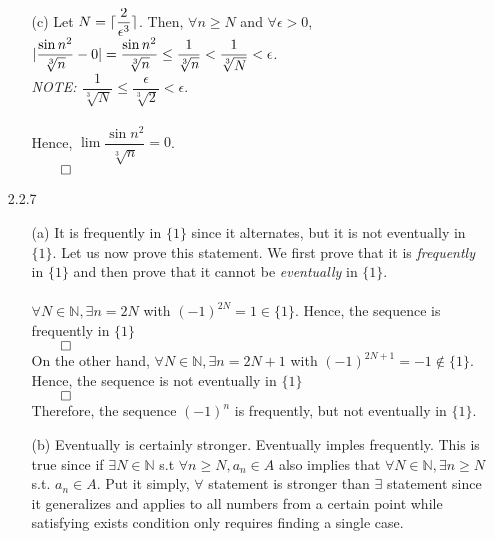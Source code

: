 \documentclass[11pt]{article}
\DeclarePairedDelimiter\abs{\lvert}{\rvert}%
\DeclarePairedDelimiter{\ceil}{\lceil}{\rceil}
\newcommand{\nats}{\mathbb{N}}
\begin{document}
\begin{itemize}
\begin{itemize}
            \item[(c)]
                Let $N = \ceil{\dfrac{2}{\epsilon^3}}$. Then, $\forall n \geq N$
                and $\forall \epsilon > 0$, $\abs{\dfrac{\sin{n^2}}{\sqrt[3]{n}}
                - 0} = \dfrac{\sin{n^2}}{\sqrt[3]{n}} \leq \dfrac{1}{\sqrt[3]{n}}
                < \dfrac{1}{\sqrt[3]{N}} < \epsilon$.\\
                \textit{NOTE: $\dfrac{1}{\sqrt[3]{N}} \leq
                \dfrac{\epsilon}{\sqrt[3]{2}} < \epsilon$}.\\\\
                Hence, $\lim\dfrac{\sin{n^2}}{\sqrt[3]{n}} = 0$.\\
                $\qed$
        \end{itemize}

    \item[2.2.7]
        \begin{itemize}
            \item[(a)]
                It is frequently in $\{1\}$ since it alternates, but it is not
                eventually in $\{1\}$. Let us now prove this statement. We
                first prove that it is \textit{frequently} in $\{1\}$ and then
                prove that it cannot be \textit{eventually} in $\{1\}$.
                \\\\
                $\forall N \in \nats, \exists n = 2N$ with $(-1)^{2N} = 1 \in
                \{1\}$. Hence, the sequence is frequently in $\{1\}$\\
                $\qed$
                \\
                On the other hand, $\forall N \in \nats, \exists n = 2N + 1$
                with $(-1)^{2N + 1} = -1 \notin \{1\}$. Hence, the sequence is
                not eventually in $\{1\}$\\
                $\qed$
                \\
                Therefore, the sequence $(-1)^n$ is frequently, but not
                eventually in $\{1\}$.

            \item[(b)]
                Eventually is certainly stronger. Eventually imples frequently.
                This is true since if $\exists N \in \nats$ s.t $\forall n \geq
                N, a_n \in A$ also implies that $\forall N \in \nats, \exists n
                \geq N$ s.t. $a_n \in A$. Put it simply, $\forall$ statement is
                stronger than $\exists$ statement since it generalizes and
                applies to all numbers from a certain point while satisfying
                exists condition only requires finding a single case.


\end{itemize}
\end{itemize}
\end{document}
